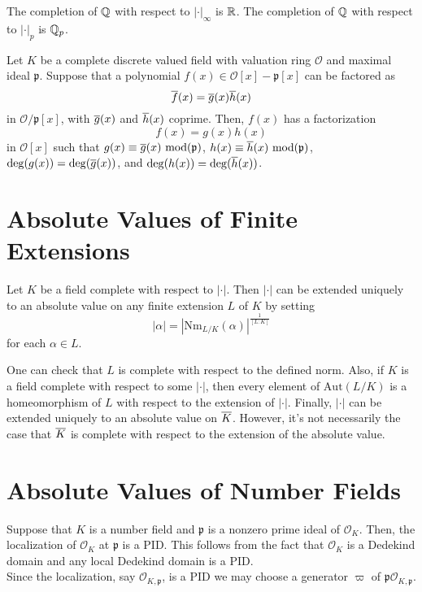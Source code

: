 \begin{example}
    The completion of $\mathbb{Q}$ with respect to $|\cdot|_\infty$ is $\mathbb{R}$. The completion of $\mathbb{Q}$ with respect to $|\cdot|_p$ is $\mathbb{Q}_p$.
\end{example}

\begin{theorem}
    Let $K$ be a complete discrete valued field with valuation ring $\mathcal{O}$ and maximal ideal $\mathfrak{p}$. Suppose that a polynomial $f(x) \in \mathcal{O}[x] - \mathfrak{p}[x]$ can be factored as
        \[\overline{f}(x) = \overline{g}(x)\overline{h}(x)\]
    in $\mathcal{O}/\mathfrak{p}[x]$, with $\overline{g}(x)$ and $\overline{h}(x)$ coprime. Then, $f(x)$ has a factorization
        \[f(x) = g(x) h(x)\]
    in $\mathcal{O}[x]$ such that $g(x) \equiv \overline{g}(x) \textrm{ mod}(\mathfrak{p})$, $h(x) \equiv \overline{h}(x) \textrm{ mod}(\mathfrak{p})$, $\deg(g(x)) = \deg(\overline{g}(x))$, and $\deg(h(x)) = \deg(\overline{h}(x))$.
\end{theorem}

\section{Absolute Values of Finite Extensions}


\begin{theorem}
    Let $K$ be a field complete with respect to $|\cdot|$. Then $|\cdot|$ can be extended uniquely to an absolute value on any finite extension $L$ of $K$ by setting
        \[|\alpha| = \left| \textrm{Nm}_{L/K}(\alpha)\right|^{\frac{1}{[L:K]}}\]
    for each $\alpha \in L$.
\end{theorem}

One can check that $L$ is complete with respect to the defined norm. Also, if $K$ is a field complete with respect to some $|\cdot|$, then every element of $\textrm{Aut}(L/K)$ is a homeomorphism of $L$ with respect to the extension of $|\cdot|$. Finally, $|\cdot|$ can be extended uniquely to an absolute value on $\overline{K}$. However, it's not necessarily the case that $\overline{K}$ is complete with respect to the extension of the absolute value.

\section{Absolute Values of Number Fields}

Suppose that $K$ is a number field and $\mathfrak{p}$ is a nonzero prime ideal of $\mathcal{O}_{K}$. Then, the localization  
of $\mathcal{O}_{K}$ at $\mathfrak{p}$  is a PID. This follows from the fact that $\mathcal{O}_{K}$ is a Dedekind domain and any local Dedekind domain is a PID.\\

Since the localization, say $\mathcal{O}_{K,\mathfrak{p}}$, is a PID we may choose a generator $\varpi$ of $\mathfrak{p} \mathcal{O}_{K,\mathfrak{p}}$.